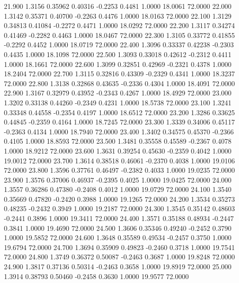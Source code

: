   21.900   1.3156   0.35962   0.40316  -0.2253   0.4481   1.0000  18.0061  72.0000
  22.000   1.3142   0.35371   0.40700  -0.2263   0.4476   1.0000  18.0163  72.0000
  22.100   1.3129   0.34813   0.41084  -0.2272   0.4471   1.0000  18.0292  72.0000
  22.200   1.3117   0.34274   0.41469  -0.2282   0.4463   1.0000  18.0467  72.0000
  22.300   1.3105   0.33772   0.41855  -0.2292   0.4452   1.0000  18.0719  72.0000
  22.400   1.3096   0.33337   0.42238  -0.2303   0.4435   1.0000  18.1098  72.0000
  22.500   1.3093   0.33018   0.42612  -0.2312   0.4411   1.0000  18.1661  72.0000
  22.600   1.3099   0.32851   0.42969  -0.2321   0.4378   1.0000  18.2404  72.0000
  22.700   1.3115   0.32816   0.43309  -0.2329   0.4341   1.0000  18.3237  72.0000
  22.800   1.3138   0.32868   0.43635  -0.2336   0.4304   1.0000  18.4091  72.0000
  22.900   1.3167   0.32979   0.43952  -0.2343   0.4267   1.0000  18.4929  72.0000
  23.000   1.3202   0.33138   0.44260  -0.2349   0.4231   1.0000  18.5738  72.0000
  23.100   1.3241   0.33348   0.44558  -0.2354   0.4197   1.0000  18.6512  72.0000
  23.200   1.3286   0.33625   0.44845  -0.2359   0.4164   1.0000  18.7245  72.0000
  23.300   1.3339   0.34006   0.45117  -0.2363   0.4134   1.0000  18.7940  72.0000
  23.400   1.3402   0.34575   0.45370  -0.2366   0.4105   1.0000  18.8593  72.0000
  23.500   1.3481   0.35558   0.45589  -0.2367   0.4078   1.0000  18.9212  72.0000
  23.600   1.3631   0.39254   0.45630  -0.2359   0.4042   1.0000  19.0012  72.0000
  23.700   1.3614   0.38518   0.46061  -0.2370   0.4038   1.0000  19.0106  72.0000
  23.800   1.3596   0.37761   0.46497  -0.2382   0.4033   1.0000  19.0235  72.0000
  23.900   1.3576   0.37006   0.46937  -0.2395   0.4025   1.0000  19.0425  72.0000
  24.000   1.3557   0.36286   0.47380  -0.2408   0.4012   1.0000  19.0729  72.0000
  24.100   1.3540   0.35669   0.47820  -0.2420   0.3988   1.0000  19.1265  72.0000
  24.200   1.3534   0.35273   0.48235  -0.2432   0.3949   1.0000  19.2187  72.0000
  24.300   1.3545   0.35142   0.48603  -0.2441   0.3896   1.0000  19.3411  72.0000
  24.400   1.3571   0.35188   0.48934  -0.2447   0.3841   1.0000  19.4690  72.0000
  24.500   1.3606   0.35346   0.49240  -0.2452   0.3790   1.0000  19.5852  72.0000
  24.600   1.3648   0.35589   0.49534  -0.2457   0.3750   1.0000  19.6794  72.0000
  24.700   1.3694   0.35909   0.49823  -0.2460   0.3718   1.0000  19.7541  72.0000
  24.800   1.3749   0.36372   0.50087  -0.2463   0.3687   1.0000  19.8248  72.0000
  24.900   1.3817   0.37136   0.50314  -0.2463   0.3658   1.0000  19.8919  72.0000
  25.000   1.3914   0.38793   0.50460  -0.2458   0.3630   1.0000  19.9577  72.0000
